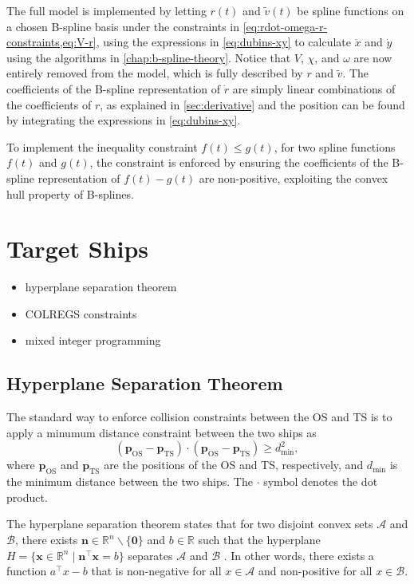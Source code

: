 The full model is implemented by letting $r(t)$ and $\tilde v(t)$ be spline functions on a chosen B-spline basis under the constraints in \cref{eq:rdot-omega-r-constraints,eq:V-r}, using the expressions in \cref{eq:dubins-xy} to calculate $\dot x$ and $\dot y$ using the algorithms in \cref{chap:b-spline-theory}. Notice that $V$, $\chi$, and $\omega$ are now entirely removed from the model, which is fully described by $r$ and $\tilde v$. The coefficients of the B-spline representation of $\dot r$ are simply linear combinations of the coefficients of $r$, as explained in \cref{sec:derivative} and the position can be found by integrating the expressions in \cref{eq:dubins-xy}.

To implement the inequality constraint $f(t) \le g(t)$, for two spline functions $f(t)$ and $g(t)$, the constraint is enforced by ensuring the coefficients of the B-spline representation of $f(t) - g(t)$ are non-positive, exploiting the convex hull property of B-splines. 

\section{Target Ships}
\begin{itemize}
    \item hyperplane separation theorem
    \item COLREGS constraints
    \item mixed integer programming
\end{itemize}

\subsection{Hyperplane Separation Theorem}
The standard way to enforce collision constraints between the OS and TS is to apply a minumum distance constraint between the two ships as
\begin{equation}\label{eq:minimum-distance}
    (\mathbf p_{\text{OS}} - \mathbf p_{\text{TS}}) \cdot (\mathbf p_{\text{OS}} - \mathbf p_{\text{TS}}) \geq d_{\text{min}}^2,
\end{equation}
where $\mathbf p_{\text{OS}}$ and $\mathbf p_{\text{TS}}$ are the positions of the OS and TS, respectively, and $d_{\text{min}}$ is the minimum distance between the two ships. The $\cdot$ symbol denotes the dot product. 

The hyperplane separation theorem states that for two disjoint convex sets $\mathcal A$ and $\mathcal B$, there exists $\mathbf n\in \mathbb R^n\backslash\{\mathbf0\}$ and $b\in\mathbb R$ such that the hyperplane $H=\{\mathbf x\in\mathbb R^n \mid \mathbf n^\top \mathbf x = b\}$ separates $\mathcal A$ and $\mathcal B$ \citep{Boyd2004-ih}. In other words, there exists a function $a^\top x - b$ that is non-negative for all $x \in \mathcal A$ and non-positive for all $x \in \mathcal B$. 

